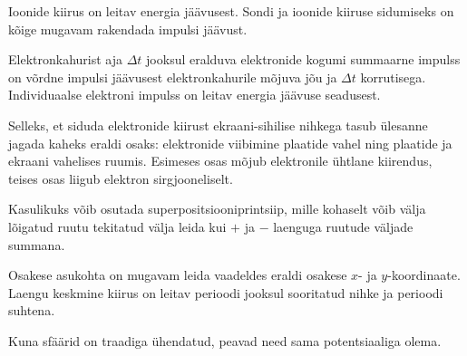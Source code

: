\documentclass[10pt]{article}
\begin{document}
{%

\hint
Ioonide kiirus on leitav energia jäävusest. Sondi ja ioonide kiiruse sidumiseks on kõige mugavam rakendada impulsi jäävust.
\probend
\bigskip


\hint
Elektronkahurist aja $\Delta t$ jooksul eralduva elektronide kogumi summaarne impulss on võrdne impulsi jäävusest elektronkahurile mõjuva jõu ja $\Delta t$ korrutisega. Individuaalse elektroni impulss on leitav energia jäävuse seadusest.
\probend
\bigskip


\hint
Selleks, et siduda elektronide kiirust ekraani-sihilise nihkega tasub ülesanne jagada kaheks eraldi osaks: elektronide viibimine plaatide vahel ning plaatide ja ekraani vahelises ruumis. Esimeses osas mõjub elektronile ühtlane kiirendus, teises osas liigub elektron sirgjooneliselt.
\probend
\bigskip


\hint
Kasulikuks võib osutada superpositsiooniprintsiip, mille kohaselt võib välja lõigatud ruutu tekitatud välja leida kui $+$ ja $-$ laenguga ruutude väljade summana.
\probend
\bigskip


\hint
Osakese asukohta on mugavam leida vaadeldes eraldi osakese $x$- ja $y$-koordinaate. Laengu keskmine kiirus on leitav perioodi jooksul sooritatud nihke ja perioodi suhtena.
\probend
\bigskip


\hint
Kuna sfäärid on traadiga ühendatud, peavad need sama potentsiaaliga olema.
\probend
\bigskip


}
\end{document}
